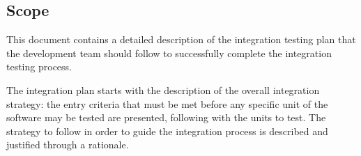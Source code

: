 \subsection{Scope}

This document contains a detailed description of the integration testing plan that the development team should follow to successfully complete the integration testing process.

The integration plan starts with the description of the overall integration strategy: the entry criteria that must be met before any specific unit of the software may be tested are presented, following with the units to test. The strategy to follow in order to guide the integration process is described and justified through a rationale.
